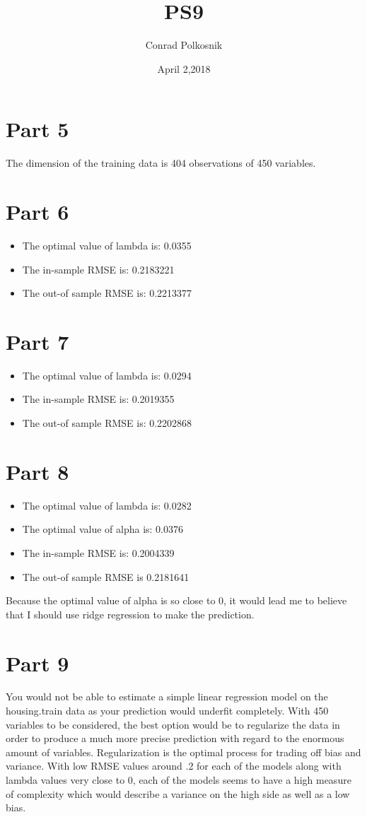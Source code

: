 \documentclass{article}
\title{PS9}
\author{Conrad Polkosnik }
\date{April 2,2018}
\begin{document}
\maketitle

\section{Part 5}
The dimension of the training data is 404 observations of 450 variables.

\section{Part 6}
\begin{itemize}
  \item The optimal value of lambda is: 0.0355
  \item The in-sample RMSE is: 0.2183221
  \item The out-of sample RMSE is: 0.2213377
\end{itemize}

\section{Part 7}
\begin{itemize}
  \item The optimal value of lambda is: 0.0294
  \item The in-sample RMSE is: 0.2019355
  \item The out-of sample RMSE is: 0.2202868
\end{itemize}

\section{Part 8}
\begin{itemize}
  \item The optimal value of lambda is: 0.0282
  \item The optimal value of alpha is: 0.0376
  \item The in-sample RMSE is: 0.2004339
  \item The out-of sample RMSE is 0.2181641
\end{itemize}

Because the optimal value of alpha is so close to 0, it would lead me to believe that I should use ridge regression to make the prediction.

\section{Part 9}
You would not be able to estimate a simple linear regression model on the housing.train data as your prediction would underfit completely. With 450 variables to be considered, the best option would be to regularize the data in order to produce a much more precise prediction with regard to the enormous amount of variables. Regularization is the optimal process for trading off bias and variance. With low RMSE values around .2 for each of the models along with lambda values very close to 0, each of the models seems to have a high measure of complexity which would describe a variance on the high side as well as a low bias.
\end{document}
